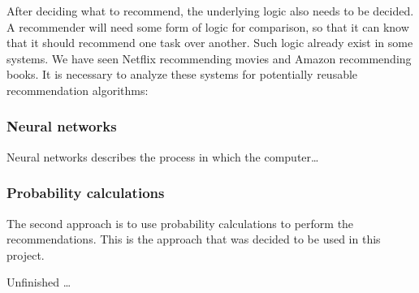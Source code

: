 After deciding what to recommend, the underlying logic also needs to be decided. A recommender will need some form of logic for comparison, so that it can know that it should recommend one task over another. Such logic already exist in some systems. We have seen Netflix recommending movies and Amazon recommending books. It is necessary to analyze these systems for potentially reusable recommendation algorithms:

\subsubsection{Neural networks}
Neural networks describes the process in which the computer\ldots

\subsubsection{Probability calculations}
The second approach is to use probability calculations to perform the recommendations. This is the approach that was decided to be used in this project. 

Unfinished \ldots
